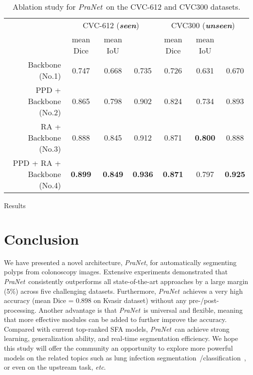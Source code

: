 \documentclass[runningheads]{llncs}
\def\etc{\emph{etc}}
\def\ourmodel{\textit{PraNet}}
\begin{document}
\begin{table}[t]
\centering
\scriptsize
\renewcommand{\arraystretch}{1.1}
\renewcommand{\tabcolsep}{3pt}
\caption{Ablation study for \ourmodel~on the CVC-612 and CVC300 datasets.
}\label{tab:Ablation}
\begin{tabular}{r||ccc|ccc}
 \hline
 \rowcolor{mygray}
 \multicolumn{1}{r||}{Settings}  & \multicolumn{3}{c|}{CVC-612 (\textit{\textbf{seen}})} &\multicolumn{3}{c}{CVC300 (\textit{\textbf{unseen}})}   \\
 \rowcolor{mygray}
 &  mean Dice  &  mean IoU  &    &  mean Dice  &  mean IoU  &   \\
 \hline
 Backbone (No.1)            & 0.747 & 0.668 & 0.735 & 0.726 & 0.631 & 0.670 \\
 PPD + Backbone (No.2)      & 0.865 & 0.798 & 0.902 & 0.824 & 0.734 & 0.893\\
 RA + Backbone (No.3)       & 0.888 & 0.845 & 0.912 & 0.871 & \textbf{0.800} & 0.888 \\
 PPD + RA + Backbone (No.4) & \textbf{0.899} & \textbf{0.849} & \textbf{0.936} & \textbf{0.871} & 0.797 & \textbf{0.925} \\
 \hline
\end{tabular}
\end{table}



\begin{figure*}[t!]
	\centering
	\begin{overpic}[width=\textwidth]{Results}
    \end{overpic}
\caption{Qualitative results of different methods. 
}
    \label{fig:Results}
\end{figure*}

\section{Conclusion}\label{conclusion}
We have presented a novel architecture, \ourmodel, for automatically segmenting polyps from colonoscopy images.
Extensive experiments demonstrated that \ourmodel~consistently outperforms all state-of-the-art approaches by a large margin (5\%) across five challenging datasets. Furthermore, \ourmodel~achieves a very high accuracy (mean Dice = 0.898 on Kvasir dataset) without any pre-/post-processing. Another advantage is that \ourmodel~is universal and flexible, meaning that more effective modules can be added to further improve the accuracy.
Compared with current top-ranked SFA models, \ourmodel~can achieve strong learning, generalization ability, and real-time segmentation efficiency. We hope this study will offer the community an opportunity to explore more powerful models on the related topics such as lung infection segmentation~\cite{fan2020inf}/classification~\cite{wu2020jcs}, or even on the upstream task, \etc.

















\end{document}
